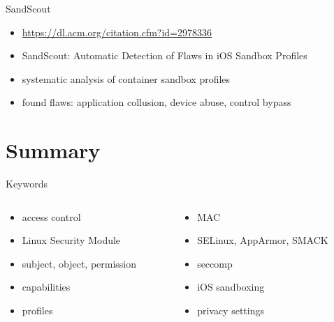 \documentclass{curs}
\begin{document}
\begin{frame}{SandScout}
  \begin{itemize}
    \pause \item \url{https://dl.acm.org/citation.cfm?id=2978336}
    \pause \item SandScout: Automatic Detection of Flaws in iOS Sandbox Profiles
    \pause \item systematic analysis of container sandbox profiles
    \pause \item found flaws: application collusion, device abuse, control bypass
  \end{itemize}
\end{frame}

\section{Summary}

\begin{frame}{Keywords}
  \begin{columns}
    \begin{column}{0.5\textwidth}
      \begin{itemize}
        \item access control
        \item Linux Security Module
        \item subject, object, permission
        \item capabilities
        \item profiles
      \end{itemize}
    \end{column}
    \begin{column}{0.5\textwidth}
      \begin{itemize}
        \item MAC
        \item SELinux, AppArmor, SMACK
        \item seccomp
        \item iOS sandboxing
        \item privacy settings
      \end{itemize}
    \end{column}
  \end{columns}
\end{frame}

%
\end{document}
